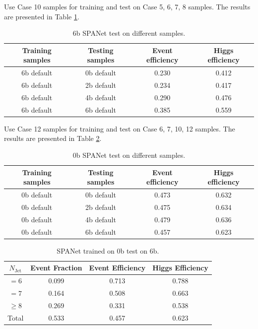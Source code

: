 \documentclass[12pt]{article}
\begin{document}
		Use Case 10 samples for training and test on Case 5, 6, 7, 8 samples. The results are presented in Table \ref{tab:SPANet_10M_6b_default_test_on_different_triHiggs_data}.
		\begin{table}[htpb]
			\centering
			\caption{6b SPANet test on different samples.}
			\label{tab:SPANet_10M_6b_default_test_on_different_triHiggs_data}
			\begin{tabular}{cc|cc}
				Training samples & Testing samples & Event efficiency & Higgs efficiency \\
				\hline 
				6b default      & 0b default     & 0.230        & 0.412    \\
				6b default      & 2b default     & 0.234        & 0.417    \\
				6b default      & 4b default     & 0.290        & 0.476    \\
				6b default      & 6b default     & 0.385        & 0.559    \\
			\end{tabular}
		\end{table}	

		Use Case 12 samples for training and test on Case 6, 7, 10, 12 samples. The results are presented in Table \ref{tab:SPANet_10M_0b_default_test_on_different_triHiggs_data}. 
		\begin{table}[htpb]
			\centering
			\caption{0b SPANet test on different samples.}
			\label{tab:SPANet_10M_0b_default_test_on_different_triHiggs_data}
			\begin{tabular}{cc|cc}
				Training samples & Testing samples & Event efficiency & Higgs efficiency \\
				\hline 
				0b default      & 0b default     & 0.473        & 0.632    \\
				0b default      & 2b default     & 0.475        & 0.634    \\
				0b default      & 4b default     & 0.479        & 0.636    \\
				0b default      & 6b default     & 0.457        & 0.623    \\
			\end{tabular}
		\end{table}	

		\begin{table}[htpb]
			\centering
			\caption{SPANet trained on 0b test on 6b.}
			\label{tab:SPANet_test_on_different_triHiggs_data}
			\begin{tabular}{c|c|cc}
				$N_\text{Jet}$ & Event Fraction & Event Efficiency & Higgs Efficiency \\
				\hline
				$=6$	  &   0.099             &    0.713              &    0.788             \\
				$=7$	  &   0.164             &    0.508              &    0.663             \\
				$\ge 8$	  &   0.269             &    0.331              &    0.538             \\
				Total	  &   0.533             &    0.457              &    0.623             \\
			\end{tabular}
		\end{table}
\end{document}
